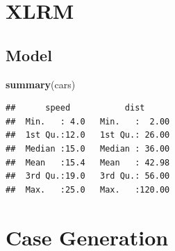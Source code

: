 \documentclass[ignorenonframetext,]{beamer}
\newenvironment{Shaded}{\begin{snugshade}}{\end{snugshade}}
\newcommand{\KeywordTok}[1]{\textcolor[rgb]{0.13,0.29,0.53}{\textbf{#1}}}
\newcommand{\NormalTok}[1]{#1}
\begin{document}
\section{XLRM}\label{xlrm}

\subsection{Model}\label{model}

\begin{Shaded}
\begin{Highlighting}[]
\KeywordTok{summary}\NormalTok{(cars)}
\end{Highlighting}
\end{Shaded}

\begin{verbatim}
##      speed           dist       
##  Min.   : 4.0   Min.   :  2.00  
##  1st Qu.:12.0   1st Qu.: 26.00  
##  Median :15.0   Median : 36.00  
##  Mean   :15.4   Mean   : 42.98  
##  3rd Qu.:19.0   3rd Qu.: 56.00  
##  Max.   :25.0   Max.   :120.00
\end{verbatim}

\section{Case Generation}\label{case-generation}
\end{document}

